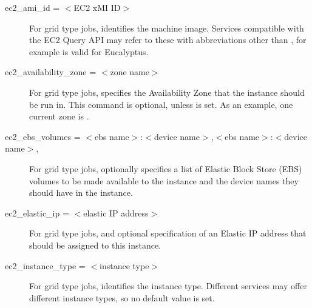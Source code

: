 \begin{description}

\label{condor-submit-ec2-ami-id}
\item[ec2\_ami\_id = $<$EC2 xMI ID$>$]
For grid type  jobs, identifies the machine image.
Services compatible with the EC2 Query API may refer to these
with abbreviations other than ,
for example  is valid for Eucalyptus.


\label{condor-submit-ec2-availability-zone}
\item[ec2\_availability\_zone = $<$zone name$>$]
For grid type  jobs, 
specifies the Availability Zone that the instance should be run in. 
This command is optional, unless  is set.
As an example, one current zone is .


\label{condor-submit-ec2-ebs-volumes}
\item[ec2\_ebs\_volumes = $<$ebs name$>$:$<$device name$>$,$<$ebs name$>$:$<$device name$>$,\Dots]
For grid type  jobs,
optionally specifies a list of Elastic Block Store (EBS)
volumes to be made available to the instance and the device names they
should have in the instance.


\label{condor-submit-ec2-elastic-id}
\item[ec2\_elastic\_ip = $<$elastic IP address$>$]
For grid type  jobs,
and optional specification of an Elastic IP address 
that should be assigned to this instance.


\label{condor-submit-ec2-instance-type}
\item[ec2\_instance\_type = $<$instance type$>$]
For grid type  jobs, identifies the instance type.
Different services may offer different instance types,
so no default value is set.



\end{description}
